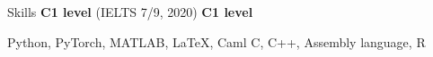 \begin{rubric}{Skills}
\entry*[English] \textbf{C1 level} (IELTS 7/9, 2020)
\entry*[Spanish] \textbf{C1 level}

 Python, PyTorch, MATLAB, \LaTeX, Caml
 C, C++, Assembly language, R


\end{rubric}